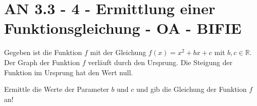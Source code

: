 \section{AN 3.3 - 4 - Ermittlung einer Funktionsgleichung - OA - BIFIE}

\begin{beispiel}[AN 3.3]{1} %
				Gegeben ist die Funktion $f$ mit der Gleichung $f(x)=x^2+bx+c$ mit $b,c\in\mathbb{R}$.
Der Graph der Funktion $f$ verläuft durch den Ursprung. Die Steigung der Funktion im Ursprung hat den Wert null.

Ermittle die Werte der Parameter $b$ und $c$ und gib die Gleichung der Funktion $f$ an!
\leer

\end{beispiel}